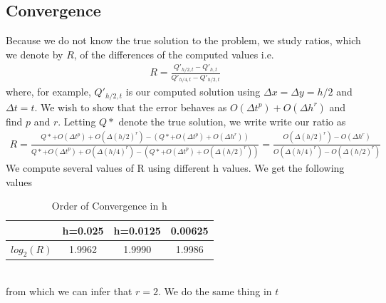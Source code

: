\subsection{Convergence}
Because we do not know the true solution to the problem, we study ratios, which we denote by $R$, of the differences of the computed values i.e. 
\begin{align*}
R=\frac{Q'_{h/2,t} - Q'_{h,t}}{Q'_{h/4,t} - Q'_{h/2,t}}
\end{align*}
where, for example, $Q'_{h/2,t}$ is our computed solution using $\Delta x = \Delta y = h/2$ and $\Delta t = t$. We wish to show that the error behaves as $O(\Delta t^p) + O(\Delta h^r)$ and find $p$ and $r$. Letting $Q*$ denote the true solution, we write write our ratio as  
\begin{align*}
R = \frac{Q*+O(\Delta t^p) + O(\Delta (h/2)^r) - (Q* + O(\Delta t^p) + O(\Delta h^r))}{Q*+O(\Delta t^p) + O(\Delta (h/4)^r) - (Q*+O(\Delta t^p) + O(\Delta (h/2)^r))} = \frac{O(\Delta (h/2)^r)-O(\Delta h^r)}{O(\Delta (h/4)^r) - O(\Delta (h/2)^r)}
\end{align*}
We compute several values of R using different h values. We get the following values
\begin{table}[]
\centering
\caption{Order of Convergence in h}
\label{my-label}
\begin{tabular}{|c|c|c|c|}
\hline 
 & h=0.025 & h=0.0125 & 0.00625 \\ 
\hline 
$log_2(R)$ & 1.9962 & 1.9990 & 1.9986 \\ 
\hline 
\end{tabular} 
\\from which we can infer that $r = 2$. We do the same thing in $t$ 
\end{table}